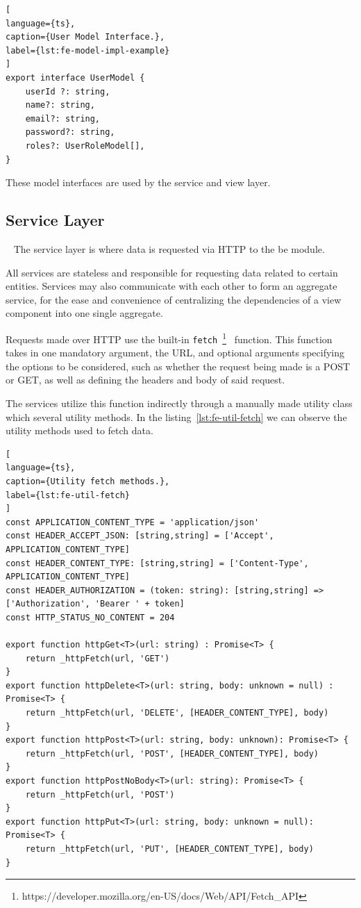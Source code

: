 \begin{lstlisting}[
language={ts},
caption={User Model Interface.},
label={lst:fe-model-impl-example}
]
export interface UserModel {
    userId ?: string,
    name?: string,
    email?: string,
    password?: string,
    roles?: UserRoleModel[],
}
\end{lstlisting}

These model interfaces are used by the service and view layer.


\subsection{Service Layer}~\label{ch:impl:sec:fe:subsec:service-layer}
The service layer is where data is requested via HTTP to the \acrshort{be} module.

All services are stateless and responsible for requesting data related to certain entities. Services may also communicate with each other to form an aggregate service, for the ease and convenience of centralizing the dependencies of a view component into one single aggregate.

Requests made over HTTP use the built-in \lstinline{fetch}~\footnote{https://developer.mozilla.org/en-US/docs/Web/API/Fetch\_API}~\label{fn:js-fetch} function. This function takes in one mandatory argument, the URL, and optional arguments specifying the options to be considered, such as whether the request being made is a POST or GET, as well as defining the headers and body of said request.

The services utilize this function indirectly through a manually made utility class which several utility methods. In the listing~\ref{lst:fe-util-fetch} we can observe the utility methods used to fetch data. 


\begin{lstlisting}[
language={ts},
caption={Utility fetch methods.},
label={lst:fe-util-fetch}
]
const APPLICATION_CONTENT_TYPE = 'application/json'
const HEADER_ACCEPT_JSON: [string,string] = ['Accept', APPLICATION_CONTENT_TYPE]
const HEADER_CONTENT_TYPE: [string,string] = ['Content-Type', APPLICATION_CONTENT_TYPE]
const HEADER_AUTHORIZATION = (token: string): [string,string] => ['Authorization', 'Bearer ' + token]
const HTTP_STATUS_NO_CONTENT = 204

export function httpGet<T>(url: string) : Promise<T> {
    return _httpFetch(url, 'GET')
}
export function httpDelete<T>(url: string, body: unknown = null) : Promise<T> {
    return _httpFetch(url, 'DELETE', [HEADER_CONTENT_TYPE], body)
}
export function httpPost<T>(url: string, body: unknown): Promise<T> {
    return _httpFetch(url, 'POST', [HEADER_CONTENT_TYPE], body)
}
export function httpPostNoBody<T>(url: string): Promise<T> {
    return _httpFetch(url, 'POST')
}
export function httpPut<T>(url: string, body: unknown = null): Promise<T> {
    return _httpFetch(url, 'PUT', [HEADER_CONTENT_TYPE], body)
}
\end{lstlisting}


